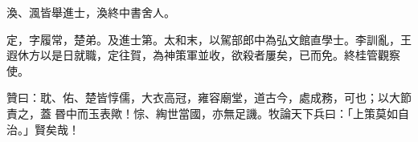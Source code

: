 \begin{pinyinscope}
 渙、渢皆舉進士，渙終中書舍人。



 定，字履常，楚弟。及進士第。太和末，以駕部郎中為弘文館直學士。李訓亂，王遐休方以是日就職，定往賀，為神策軍並收，欲殺者屢矣，已而免。終桂管觀察使。



 贊曰：耽、佑、楚皆惇儒，大衣高冠，雍容廟堂，道古今，處成務，可也；以大節責之，蓋昬中而玉表歟！悰、綯世當國，亦無足譏。牧論天下兵曰：「上策莫如自治。」賢矣哉！



\end{pinyinscope}